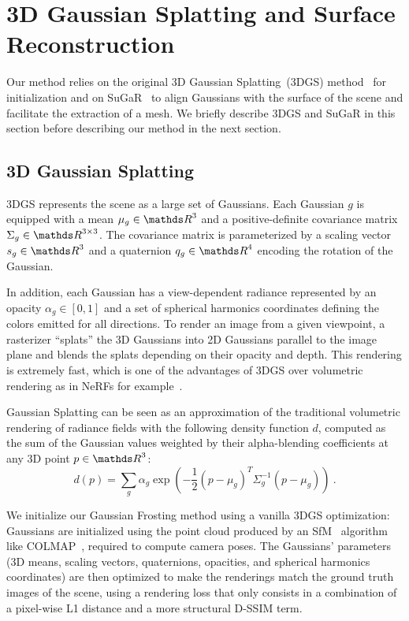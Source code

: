 \section{3D Gaussian Splatting and Surface Reconstruction}

Our method relies on the original 3D Gaussian Splatting~(3DGS) method~\cite{kerbl3Dgaussians} for initialization and on SuGaR~\cite{guedon2023sugar} to align Gaussians with the surface of the scene and facilitate the extraction of a mesh. We briefly describe 3DGS and SuGaR in this section before describing our method in the next section.


\subsection{3D Gaussian Splatting} 

3DGS represents the scene as a large set of Gaussians. Each Gaussian $g$ is equipped with a mean $\mu_g\in \IR^3$ and a positive-definite covariance matrix $\Sigma_g\in \IR^{3\times 3}$. The covariance matrix is parameterized by a scaling vector $s_g\in\IR^3$ and a quaternion $q_g\in\IR^4$ encoding the rotation of the Gaussian. 

In addition, each Gaussian has a view-dependent radiance represented by an opacity $\alpha_g\in [0,1]$ and a set of spherical harmonics coordinates defining the colors emitted for all directions. To render an image from a given viewpoint, a rasterizer ``splats'' the 3D Gaussians into 2D Gaussians parallel to the image plane and blends the splats depending on their opacity and depth. This rendering is extremely fast, which is one of the advantages of 3DGS over volumetric rendering as in NeRFs for example~\cite{mildenhall2020nerf, mueller2022instantngp, barron2022mipnerf360}.


Gaussian Splatting can be seen as an approximation of the traditional volumetric rendering of radiance fields with the following density function $d$, computed as the sum of the Gaussian values weighted by their alpha-blending coefficients at any 3D point $p\in \IR^3$:
%
 \begin{equation}
    d(p) = \sum_{g} \alpha_g \exp\left(-\frac{1}{2}(p - \mu_g)^T \Sigma^{-1}_g (p - \mu_g)\right) \> .
    \label{eq:gaussian_splatting_density}
\end{equation}

We initialize our Gaussian Frosting method using a vanilla 3DGS optimization: Gaussians are initialized using the point cloud produced by an SfM~\cite{snavely-2006-structure-from-motion} algorithm like COLMAP~\cite{schoenberger2016mvs,schoenberger2016sfm}, required to compute camera poses. The Gaussians' parameters (3D means, scaling vectors, quaternions, opacities, and spherical harmonics coordinates) are then optimized to make the renderings match the ground truth images of the scene, using a rendering loss that only consists in a combination of a pixel-wise L1 distance and a more structural D-SSIM term. 


